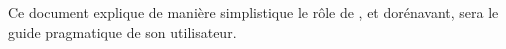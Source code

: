 \begin{center}
\parbox{33em}{
\textcolor{purplish}{
Ce document explique de manière simplistique le r\^ole
de \yerotherpblack, et dorénavant, sera le guide
pragmatique de son utilisateur.}
}
\end{center}
